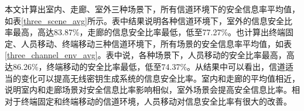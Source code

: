 \documentclass[master]{seuthesis} %
\begin{document}
\begin{Main}
\begin{table}[htbp] %
    \centering
    \caption{不同场景下的平均安全信息率数值
    \label{tdd_bar_leak_data}}
\end{table}


本文计算出室内、走廊、室外三种场景下，所有信道环境下的安全信息率平均值，如表\ref{three_scene_avg}所示。表中结果说明各种信道环境下，室外的信息安全比率最高，高达83.87\%，走廊的信息安全比率最低，低至77.27\%。也计算出终端固定、人员移动、终端移动三种信道环境下，所有场景的安全信息率平均值，如表\ref{three_channel_env_avg}。表中说，各种场景下，人员移动的安全比率最高，高达86.26\%，终端移动的安全比率最低，低至74.37\%。从结果中可以看出，信道适当的变化可以提高无线密钥生成系统的信息安全比率。室内和走廊的平均值相近，说明室内和走廊场景对安全信息比率影响相似，室外场景会提高安全信息比率。相对于终端固定和终端移动的信道环境，人员移动对信息安全比率有很大的改善。


\begin{table}[]
    \centering
    \caption{室内、走廊和室外三种场景的平均安全信息率
    \label{three_scene_avg}}
\end{table}

\begin{table}[]
    \centering
    \caption{终端固定、人员走动和终端移动三种信道环境的平均安全信息率
    \label{three_channel_env_avg}}
\end{table}


\end{Main}
\end{document}
